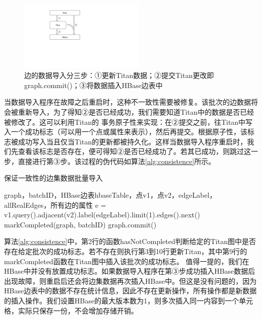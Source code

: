 \begin{figure}[htbp]
\centering
\includegraphics[width=60mm]{fig/insert_steps.pdf}
\caption{边的数据导入分三步：①更新Titan数据；②提交Titan更改即graph.commit()；③将数据插入HBase边表中}
\label{fig:insert_steps}
\end{figure}

当数据导入程序在故障之后重启时，这种不一致性需要被修复。该批次的边数据将会被重新导入，为了得知②是否已经成功，我们需要知道Titan中的数据是否已经被修改了。这可以利用Titan的
事务原子性来实现：在②提交之前，往Titan中写入一个成功标志（可以用一个点或属性来表示），然后再提交。根据原子性，该标志被成功写入当且仅当Titan的更新都被持久化。这样当数据导入程序重启时，我们先查看该标志是否存在，便可得知②是否已经成功了。若其已成功，则跳过这一步，直接进行第③步。该过程的伪代码如算法\ref{alg:consistence}所示。

\begin{algorithm}
\caption{保证一致性的边集数据批量导入}
\label{alg:consistence}
\begin{algorithmic}[1] %
\REQUIRE graph，batchID，HBase边表hbaseTable，点v1，点v2，edgeLabel，allRealEdges，所有边的属性
\STATE e = v1.query().adjacent(v2).label(edgeLabel).limit(1).edges().next()
	\ENDIF
	\ENDFOR
	\STATE markCompleted(graph, batchID)
	\STATE graph.commit()
\ENDIF
{}
\ENDFOR
\end{algorithmic}
\end{algorithm}

算法\ref{alg:consistence}中，第2行的函数hasNotCompleted判断给定的Titan图中是否存在给定批次的成功标志。若不存在则执行第3到10行更新Titan，其中第9行的markCompleted函数在Titan图中插入该批次的成功标志。
值得一提的，我们在HBase中并没有放置成功标志。如果数据导入程序在第③步成功插入HBase数据后出现故障，则重启后还会将边集数据再次插入HBase中。但这是没有问题的，因为HBase边表中的数据不存在统计信息，因此不存在更新操作，所有操作都是新数据的插入操作。我们设置HBase的最大版本数为1，则多次插入同一内容到一个单元格，实际只保存一份，不会增加存储开销。


